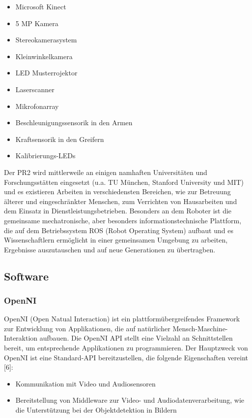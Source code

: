 \begin{itemize}
  \item Microsoft Kinect
  \item 5 MP Kamera
  \item Stereokamerasystem
  \item Kleinwinkelkamera
  \item LED Musterrojektor
  \item Laserscanner
  \item Mikrofonarray
  \item Beschleunigungssensorik in den Armen
  \item Kraftsensorik in den Greifern
  \item Kalibrierungs-LEDs
\end{itemize}

Der PR2 wird mittlerweile an einigen namhaften Universitäten und Forschungsstätten eingesetzt (u.a. TU München, Stanford University und MIT) und es existieren Arbeiten in verschiedensten Bereichen, wie zur Betreuung älterer und eingeschränkter Menschen, zum Verrichten von Hausarbeiten  und dem Einsatz in Dienstleistungsbetrieben.
Besonders an dem Roboter ist die gemeinsame mechatronische, aber besonders informationstechnische Plattform, die auf dem Betriebssystem ROS (Robot Operating System)  aufbaut und es Wissenschaftlern ermöglicht in einer gemeinsamen Umgebung zu arbeiten, Ergebnisse auszutauschen und auf neue Generationen zu übertragben.

\subsection{Software}
\subsubsection{OpenNI}

OpenNI (Open Natual Interaction) ist ein plattformübergreifendes Framework zur Entwicklung von Applikationen, die auf natürlicher Mensch-Maschine-Interaktion aufbauen. Die OpenNI API stellt eine Vielzahl an Schnittstellen bereit, um entsprechende Applikationen zu programmieren. Der Hauptzweck von OpenNI ist eine Standard-API bereitzustellen, die folgende Eigenschaften vereint [6]:

\begin{itemize}
  \item Kommunikation mit Video und Audiosensoren
  \item Bereitstellung von Middleware zur Video- und Audiodatenverarbeitung, wie die Unterstützung bei der Objektdetektion in Bildern
\end{itemize}

